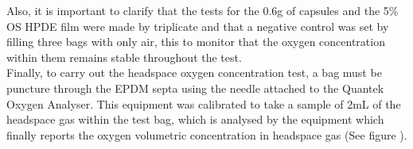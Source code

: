 \begin{refsection}
Also, it is important to clarify that the tests for the 0.6g of capsules and the 5\% OS HPDE film were made by triplicate and that a negative control was set by filling three bags with only air, this to monitor that the oxygen concentration within them remains stable throughout the test. \\

Finally, to carry out the headspace oxygen concentration test, a bag must be puncture through the EPDM septa using the needle attached to the Quantek Oxygen Analyser. This equipment was calibrated to take a sample of 2mL of the headspace gas within the test bag, which is analysed by the equipment which finally  reports the oxygen volumetric concentration in headspace gas (See figure ). 
 
 
 
 
 




\end{refsection}